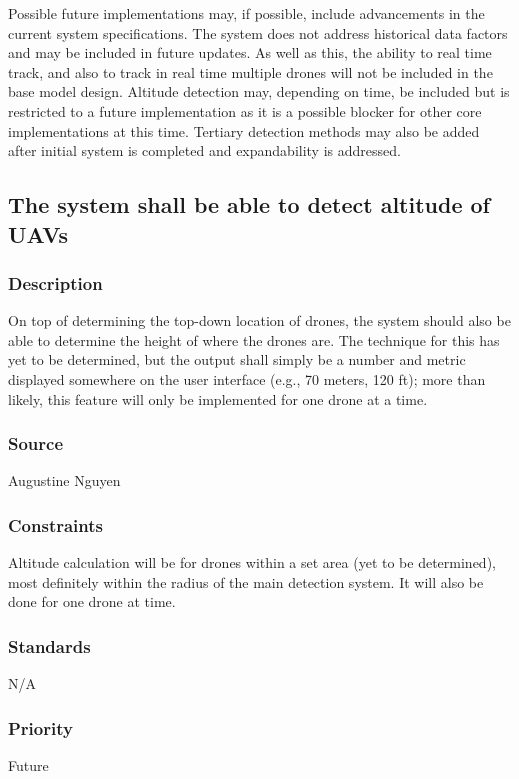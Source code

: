 Possible future implementations may, if possible, include advancements in the current system specifications. The system does not address historical data factors and may be included in future updates. As well as this, the ability to real time track, and also to track in real time multiple drones will not be included in the base model design. Altitude detection may, depending on time, be included but is restricted to a future implementation as it is a possible blocker for other core implementations at this time. Tertiary detection methods may also be added after initial system is completed and expandability is addressed.

\subsection{The system shall be able to detect altitude of UAVs}
\subsubsection{Description}
On top of determining the top-down location of drones, the system should also be able to determine the height of where the drones are.  The technique for this has yet to be determined, but the output shall simply be a number and metric displayed somewhere on the user interface (e.g., 70 meters, 120 ft); more than likely, this feature will only be implemented for one drone at a time.
\subsubsection{Source}
Augustine Nguyen
\subsubsection{Constraints}
Altitude calculation will be for drones within a set area (yet to be determined), most definitely within the radius of the main detection system.  It will also be done for one drone at time.
\subsubsection{Standards}
N/A
\subsubsection{Priority}
Future
